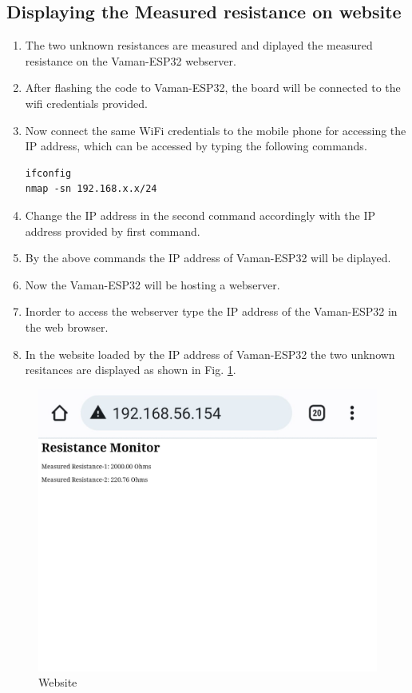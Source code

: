 \subsection{Displaying the Measured resistance on website}
\begin{enumerate}[label=\thesection.\arabic*.,ref=\thesection.\theenumi]
\item The two unknown resistances are measured and diplayed the measured 
resistance on the Vaman-ESP32 webserver.
\item After flashing the code to Vaman-ESP32, the board will be connected to the
wifi credentials provided.
\item Now connect the same WiFi credentials to the mobile phone for accessing 
the IP address, which can be accessed by typing the following commands.
\begin{lstlisting}
ifconfig
nmap -sn 192.168.x.x/24
\end{lstlisting}
\item Change the IP address in the second command accordingly with the IP 
address provided by first command.
\item By the above commands the IP address of Vaman-ESP32 will be diplayed.
\item Now the Vaman-ESP32 will be hosting a webserver.
\item Inorder to access the webserver type the IP address of the Vaman-ESP32 in 
the web browser.
\item In the website loaded by the IP address of Vaman-ESP32 the two unknown 
resitances are displayed as shown in Fig. \ref{fig:website_results}.
\end{enumerate}

\begin{figure}[!ht]
\centering
\includegraphics[width=\columnwidth]{vaman-esp32/i2c-resistance/figs/website.jpeg}
\caption{Website}
\label{fig:website_results}
\end{figure}

